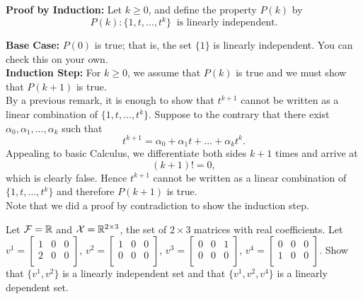         
\textbf{Proof by Induction:} Let $k\ge 0$, and define the property $P(k)$ by
        $$P(k): \{ 1, t, \ldots, t^k\}~\text{ is linearly independent.} $$
        
\textbf{Base Case:} $P(0)$ is true; that is, the set $\{1\}$ is linearly independent. You can check this on your own. \\

\textbf{Induction Step:} For $k\ge 0$, we assume that ${P}(k)$ is true and we must show that ${P}(k+1)$ is true. \\

By a previous remark, it is enough to show that $t^{k+1}$ cannot be written as a linear combination of $\{ 1, t, \ldots, t^k\}$. Suppose to the contrary that there exist $\alpha_0, \alpha_1, \ldots, \alpha_k$ such that 
$$ t^{k+1}=\alpha_0+\alpha_1t+\dots+\alpha_{k}t^{k}.$$ 
Appealing to basic Calculus, we differentiate both sides $k+1$ times and arrive at 
$$ (k+1)!=0,$$
which is clearly false. Hence $t^{k+1}$ cannot be written as a linear combination of $\{ 1, t, \ldots, t^k\}$ and therefore $P(k+1)$ is true.\\

Note that we did a proof by contradiction to show the induction step. 
\Qed
        
\vspace*{.2cm}

\begin{example} 
Let $\mathcal{F}=\mathbb R$ and $\mathcal{X}=\mathbb R^{2 \times 3}$, the set of $2 \times 3$ matrices with real coefficients. Let $v^1=\begin{bmatrix}
    1 & 0 & 0\\
    2 & 0 & 0\\
    \end{bmatrix}$, $v^2=\begin{bmatrix}
    1 & 0 & 0\\
    0 & 0 & 0\\
    \end{bmatrix}$, $v^3=\begin{bmatrix}
    0 & 0 & 1\\
    0 & 0 & 0\\
    \end{bmatrix}$, $v^4=\begin{bmatrix}
    0 & 0 & 0\\
    1 & 0 & 0\\
    \end{bmatrix}$. Show that $\{v^1,v^2\}$ is a linearly independent set and that $\{v^1,v^2, v^4\}$ is a linearly dependent set.
\end{example}

